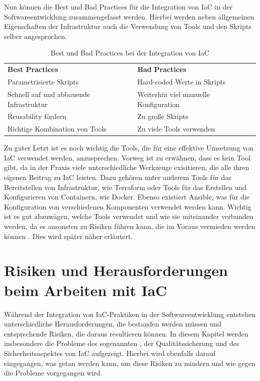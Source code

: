 \documentclass[biblatex]{lni}
\begin{document}
Nun können die Best und Bad Practices für die Integration von IaC in der Softwareentwicklung zusammengefasst werden. Hierbei werden neben allgemeinen Eigenschaften der Infrastruktur auch die Verwendung von Tools und den Skripts selber angesprochen.
\newline
\begin{table}[]
\centering
\begin{tabular}{|l|l|}
\textbf{Best Practices}                          & \textbf{Bad Practices}                         \\
Parametrisierte Skripts                 & Hard-coded Werte in Skripts           \\
Schnell auf und abbauende Infrastruktur & Weiterhin viel manuelle Konfiguration \\
Reusability fördern                     & Zu große Skripts                      \\
Richtige Kombination von Tools          & Zu viele Tools verwenden             
\end{tabular}
\caption{Best und Bad Practices bei der Integration von IaC \cite{Guerriero.2019}}
\end{table}

Zu guter Letzt ist es noch wichtig die Tools, die für eine effektive Umsetzung von IaC verwendet werden, anzusprechen. Vorweg ist zu erwähnen, dass es kein  Tool gibt, da in der Praxis viele unterschiedliche Werkzeuge exisitieren, die alle ihren eigenen Beitrag zu IaC leisten. Dazu gehören unter anderem Tools für das Bereitstellen von Infrastruktur, wie Terraform oder Tools für das Erstellen und Konfigurieren von Containern, wie Docker. Ebenso existiert Ansible, was für die Konfiguration von verschiedenen Komponenten verwendet werden kann. Wichtig ist es gut abzuwägen, welche Tools verwendet und wie sie miteinander verbunden werden, da es ansonsten zu Risiken führen kann, die im Voraus vermieden werden können \cite{Guerriero.2019}. Dies wird später näher erläutert.

\section{Risiken und Herausforderungen beim Arbeiten mit IaC}
Während der Integration von IaC-Praktiken in der Softwareentwicklung entstehen unterschiedliche Herausforderungen, die bestanden werden müssen und entsprechende Risiken, die daraus resultieren können. In diesem Kapitel werden insbesondere die Probleme des sogenannten , der Qualitätssicherung und des Sicherheitsaspektes von IaC aufgezeigt. Hierbei wird ebenfalls darauf eingegangen, was getan werden kann, um diese Risiken zu mindern und wie gegen die Probleme vorgegangen wird.
\end{document}
